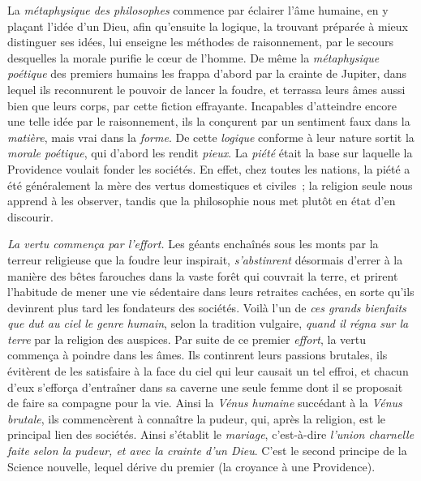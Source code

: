 \documentclass[french,twoside]{book} %
\newcommand\chaptercont{} %
\begin{document}
\chaptercont
\noindent  La {\itshape métaphysique des philosophes} commence par éclairer l’âme humaine, en y plaçant l’idée d’un Dieu, afin qu’ensuite la logique, la trouvant préparée à mieux distinguer ses idées, lui enseigne les méthodes de raisonnement, par le secours desquelles la morale purifie le cœur de l’homme. De même la {\itshape métaphysique poétique} des premiers humains les frappa d’abord par la crainte de Jupiter, dans lequel ils reconnurent le pouvoir de lancer la foudre, et terrassa leurs âmes aussi bien que leurs corps, par cette fiction effrayante. Incapables d’atteindre encore une telle idée par le raisonnement, ils la conçurent par un sentiment faux dans la {\itshape matière}, mais vrai dans la {\itshape forme}. De cette {\itshape logique} conforme à leur nature sortit la {\itshape morale poétique}, qui d’abord les rendit {\itshape pieux}.  La {\itshape piété} était la base sur laquelle la Providence voulait fonder les sociétés. En effet, chez toutes les nations, la piété a été généralement la mère des vertus domestiques et civiles ; la religion seule nous apprend à les observer, tandis que la philosophie nous met plutôt en état d’en discourir.\par
{\itshape La vertu commença par l’effort.} Les géants enchaînés sous les monts par la terreur religieuse que la foudre leur inspirait, {\itshape s’abstinrent} désormais d’errer à la manière des bêtes farouches dans la vaste forêt qui couvrait la terre, et prirent l’habitude de mener une vie sédentaire dans leurs retraites cachées, en sorte qu’ils devinrent plus tard les fondateurs des sociétés. Voilà l’un de {\itshape ces grands bienfaits que dut au ciel le genre humain}, selon la tradition vulgaire, {\itshape quand il régna sur la terre} par la religion des auspices. Par suite de ce premier {\itshape effort}, la vertu commença à poindre dans les âmes. Ils continrent leurs passions brutales, ils évitèrent de les satisfaire à la face du ciel qui leur causait un tel effroi, et chacun d’eux s’efforça d’entraîner dans sa caverne une seule femme dont il se proposait de faire sa compagne pour la vie. Ainsi la {\itshape Vénus humaine} succédant à la {\itshape Vénus brutale}, ils commencèrent à connaître la pudeur, qui, après la religion, est le principal lien des sociétés. Ainsi s’établit le {\itshape mariage}, c’est-à-dire {\itshape l’union charnelle faite selon la pudeur, et avec la crainte d’un Dieu}. C’est le second principe de la Science nouvelle, lequel dérive du premier (la croyance à une Providence).\par
\end{document}
